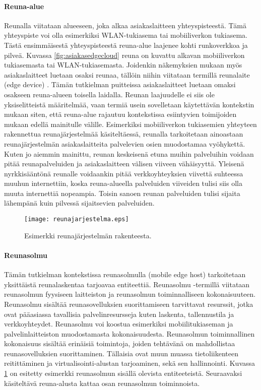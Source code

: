 \paragraph{Reuna-alue} 
Reunalla viitataan alueeseen, joka alkaa asiakaslaitteen yhteyspisteestä. Tämä yhteyspiste voi olla esimerkiksi WLAN-tukiasema tai mobiiliverkon tukiasema. Tästä ensimmäisestä yhteyspisteestä reuna-alue laajenee kohti runkoverkkoa ja pilveä.
Kuvassa \ref{fig:asiakasedgecloud} reuna on kuvattu alkavan mobiiliverkon tukiasemasta tai WLAN-tukiasemasta.
Joidenkin näkemyksien mukaan myös asiakaslaitteet luetaan osaksi reunaa, tällöin niihin viitataan termillä reunalaite (edge device) \cite{garcia}.
Tämän tutkielman puitteissa asiakaslaitteet luetaan omaksi osakseen reuna-alueen toisella laidalla.
Reunan laajuudelle ei siis ole yksiselitteistä määritelmää, vaan termiä usein sovelletaan käytettävän kontekstin mukaan siten, että reuna-alue rajautuu kontekstissa esiintyvien toimijoiden mukaan edellä mainitulle välille.
Esimerkiksi mobiiliverkon tukiasemien yhteyteen rakennettua reunajärjestelmää käsiteltäessä, reunalla tarkoitetaan ainoastaan reunajärjestelmän asiakaslaitteita palvelevien osien muodostamaa vyöhykettä. 
Kuten jo aiemmin mainittu, reunan keskeisenä etuna muihin palveluihin voidaan pitää reunapalveluiden ja asiakaslaitteen välisen viiveen vähäisyyttä.
Yleisenä nyrkkisääntönä reunalle voidaankin pitää verkkoyhteyksien viivettä suhteessa muuhun internettiin, koska reuna-alueella palveluiden viiveiden tulisi siis olla muuta internettiä nopeampia. Toisin sanoen reunan palveluiden tulisi sijaita lähempänä kuin pilvessä sijaitsevien palveluiden.

\begin{figure}[tb]
\texttt{[image: reunajarjestelma.eps]}
\caption{Esimerkki reunajärjestelmän rakenteesta.} \label{fig:reunajarjestelma}
\end{figure}


\paragraph{Reunasolmu} 
Tämän tutkielman kontekstissa reunasolmulla (mobile edge host) tarkoitetaan yksittäistä reunalaskentaa tarjoavaa entiteettiä\cite{etsirefarch}.
Reunasolmu -termillä viitataan reunasolmun fyysiseen laitteiston ja reunasolmun toiminnalliseen kokonaisuuteen.
Reunasolmu sisältää reunasovelluksien suorittamiseen tarvittavat resurssit, jotka ovat pääasiassa tavallisia palvelinresursseja kuten laskenta, tallennustila ja verkkoyhteydet.
Reunasolmu voi koostua esimerkiksi mobiilitukiaseman ja palvelinlaitteiston muodostamasta kokonaisuudesta. 
Reunasolmun toiminnallinen kokonaisuus sisältää erinäisiä toimintoja, joiden tehtävänä on mahdollistaa reunasovelluksien suorittaminen.
Tällaisia ovat muun muassa tietoliikenteen reitittäminen ja virtualisointi-alustan tarjoaminen, sekä sen hallinnointi.
Kuvassa \ref{fig:reunajarjestelma} on esitetty esimerkki reunasolmun sisällä olevista entiteeteistä. 
Seuraavaksi käsiteltävä reuna-alusta kattaa osan reunasolmun toiminnoista.


